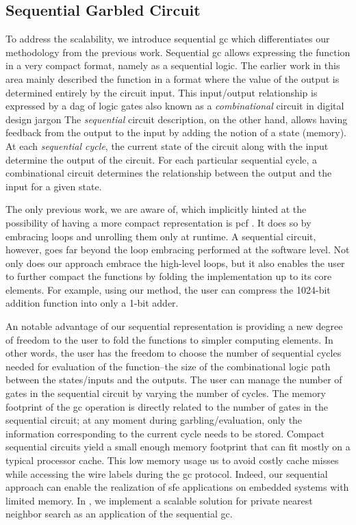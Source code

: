 \subsection{Sequential Garbled Circuit}
To address the scalability, we introduce sequential \acrfull{gc} which differentiates our methodology from the previous work.
Sequential \acrshort{gc} allows expressing the function in a very compact format, namely as a sequential logic.
The earlier work in this area mainly described the function in a format where the value of the output is determined entirely by the circuit input.
This input/output relationship is expressed by a \acrfull{dag} of logic gates also known as a \textit{combinational} circuit in digital design jargon
The \textit{sequential} circuit description, on the other hand, allows having feedback from the output to the input by adding the notion of a state (memory).
At each \textit{sequential cycle}, the current state of the circuit along with the input determine the output of the circuit.
For each particular sequential cycle, a combinational circuit determines the relationship between the output and the input for a given state.

The only previous work, we are aware of, which implicitly hinted at the possibility of having a more compact representation is \gls{pcf} \cite{kreuter2013pcf}.
It does so by embracing loops and unrolling them only at runtime.
A sequential circuit, however, goes far beyond the loop embracing performed at the software level.
Not only does our approach embrace the high-level loops, but it also enables the user to further compact the functions by folding the implementation up to its core elements.
For example, using our method, the user can compress the 1024-bit addition function into only a 1-bit adder.

An notable advantage of our sequential representation is providing a new degree of freedom to the user to fold the functions to simpler computing elements.
In other words, the user has the freedom to choose the number of sequential cycles needed for evaluation of the function--the size of the combinational logic path between the states/inputs and the outputs.
The user can manage the number of gates in the sequential circuit by varying the number of cycles.
The memory footprint of the \acrshort{gc} operation is directly related to the number of gates in the sequential circuit; at any moment during garbling/evaluation, only the information corresponding to the current cycle needs to be stored.
Compact sequential circuits yield a small enough memory footprint that can fit mostly on a typical processor cache.
This low memory usage us to avoid costly cache misses while accessing the wire labels during the \acrshort{gc} protocol.
Indeed, our sequential approach can enable the realization of \acrshort{sfe} applications on embedded systems with limited memory.
In , we implement a scalable solution for private nearest neighbor search as an application of the sequential \acrshort{gc}.

